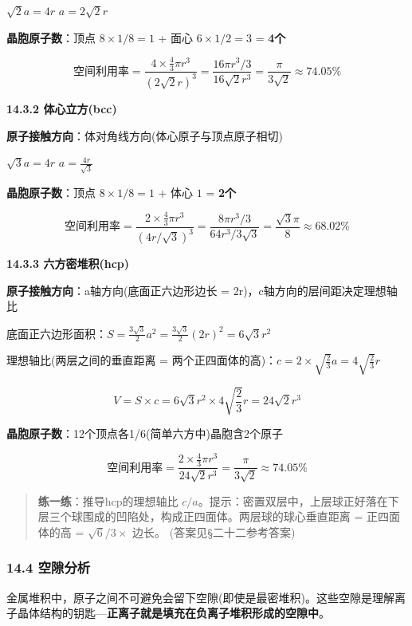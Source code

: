 \(\sqrt{2}a = 4r\) \箭 \(a = 2\sqrt{2}r\)

\textbf{晶胞原子数}：顶点 \(8 \times 1/8 = 1\) + 面心 \(6 \times 1/2 = 3\) = \textbf{4个}

\[
\text{空间利用率} = \frac{4 \times \frac{4}{3}\pi r^3}{(2\sqrt{2}r)^3} = \frac{16\pi r^3 / 3}{16\sqrt{2}r^3} = \frac{\pi}{3\sqrt{2}} \approx 74.05\%
\]

\textbf{14.3.2 体心立方(bcc)}

\textbf{原子接触方向}：体对角线方向(体心原子与顶点原子相切)

\(\sqrt{3}a = 4r\) \箭 \(a = \frac{4r}{\sqrt{3}}\)

\textbf{晶胞原子数}：顶点 \(8 \times 1/8 = 1\) + 体心 \(1\) = \textbf{2个}

\[
\text{空间利用率} = \frac{2 \times \frac{4}{3}\pi r^3}{(4r/\sqrt{3})^3} = \frac{8\pi r^3 / 3}{64r^3 / 3\sqrt{3}} = \frac{\sqrt{3}\pi}{8} \approx 68.02\%
\]

\textbf{14.3.3 六方密堆积(hcp)}

\textbf{原子接触方向}：a轴方向(底面正六边形边长 = 2r)，c轴方向的层间距决定理想轴比

底面正六边形面积：\(S = \frac{3\sqrt{3}}{2}a^2 = \frac{3\sqrt{3}}{2}(2r)^2 = 6\sqrt{3}r^2\)

理想轴比(两层之间的垂直距离 = 两个正四面体的高)：\(c = 2 \times \sqrt{\frac{2}{3}}a = 4\sqrt{\frac{2}{3}}r\)

\[
V = S \times c = 6\sqrt{3}r^2 \times 4\sqrt{\frac{2}{3}}r = 24\sqrt{2}r^3
\]

\textbf{晶胞原子数}：12个顶点各1/6(简单六方中)\箭 晶胞含2个原子

\[
\text{空间利用率} = \frac{2 \times \frac{4}{3}\pi r^3}{24\sqrt{2}r^3} = \frac{\pi}{3\sqrt{2}} \approx 74.05\%
\]

\begin{quote}
\textbf{练一练}：推导hcp的理想轴比 \(c/a\)。提示：密置双层中，上层球正好落在下层三个球围成的凹陷处，构成正四面体。两层球的球心垂直距离 = 正四面体的高 = \(\sqrt{6}/3 \times\) 边长。
(答案见§二十二参考答案)
\end{quote}

\subsubsection{14.4 空隙分析}\label{ux7a7aux9699ux5206ux6790}

金属堆积中，原子之间不可避免会留下空隙(即使是最密堆积)。这些空隙是理解离子晶体结构的钥匙---\textbf{正离子就是填充在负离子堆积形成的空隙中}。

